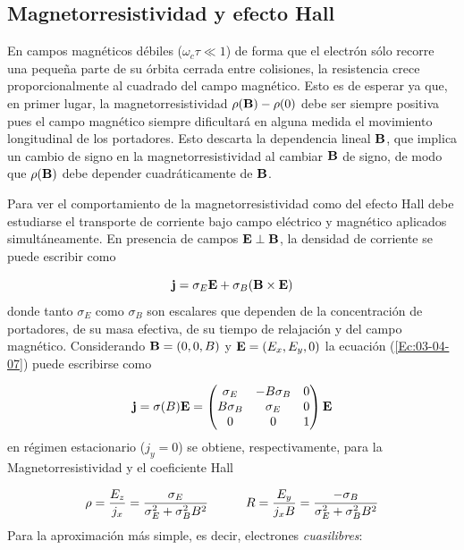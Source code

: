 \subsection{Magnetorresistividad y efecto Hall}

En campos magnéticos débiles ($\omega_c \tau \ll 1$) de forma que el electrón sólo recorre una pequeña parte de su órbita cerrada entre colisiones, la resistencia crece proporcionalmente al cuadrado del campo magnético. Esto es de esperar ya que, en primer lugar, la magnetorresistividad $\rho(\mathbf{B})-\rho(0)$ debe ser siempre positiva pues el campo magnético siempre dificultará en alguna medida el movimiento longitudinal de los portadores. Esto descarta la dependencia lineal $\mathbf{B}$, que implica un cambio de signo en la magnetorresistividad al cambiar $\mathbf{B}$ de signo, de modo que $\rho(\mathbf{B})$ debe depender cuadráticamente de $\mathbf{B}$. 

Para ver el comportamiento de la magnetorresistividad como del efecto Hall debe estudiarse el transporte de corriente bajo campo eléctrico y magnético aplicados simultáneamente. En presencia de campos $\mathbf{E}\perp\mathbf{B}$, la densidad de corriente se puede escribir como 

\begin{equation}
	\mathbf{j} = \sigma_E \mathbf{E} + \sigma_B (\mathbf{B} \times \mathbf{E}) \label{Ec:03-04-07}
\end{equation}
donde tanto $\sigma_E$ como $\sigma_B$ son escalares que dependen de la concentración de portadores, de su masa efectiva, de su tiempo de relajación y del campo magnético. Considerando $\mathbf{B}=(0,0,B)$ y $\mathbf{E}=(E_x,E_y,0)$ la ecuación (\ref{Ec:03-04-07}) puede escribirse como

\begin{equation}
	\mathbf{j} = \sigma (B) \mathbf{E} = \begin{pmatrix}
	\sigma_E & - B\sigma_B & 0 \\ 
	B \sigma_B & \sigma_E & 0 \\
	0 & 0 & 1 
	\end{pmatrix} \mathbf{E}
\end{equation}
en régimen estacionario ($j_y = 0$) se obtiene, respectivamente, para la Magnetorresistividad y el coeficiente Hall

\begin{equation}
	\rho = \frac{E_z}{j_x} = \frac{\sigma_E}{\sigma_E^2+\sigma_B^2 B^2} \quad \quad \quad R = \frac{E_y}{j_xB} =  \frac{-\sigma_B}{\sigma_E^2 + \sigma_B^2 B^2}
\end{equation}
Para la aproximación más simple, es decir, electrones \textit{cuasilibres}:

